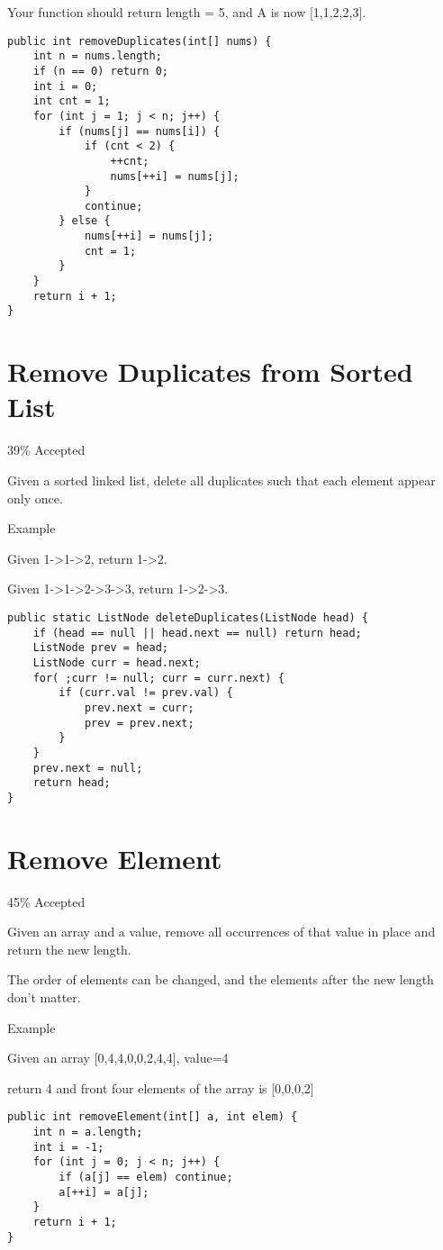 \documentclass[9pt, b5paaper]{book}
\begin{document}
Your function should return length = 5, and A is now [1,1,2,2,3].
\begin{verbatim}
public int removeDuplicates(int[] nums) {
    int n = nums.length;
    if (n == 0) return 0;
    int i = 0;
    int cnt = 1;
    for (int j = 1; j < n; j++) {
        if (nums[j] == nums[i]) {
            if (cnt < 2) {
                ++cnt;
                nums[++i] = nums[j];
            } 
            continue;   
        } else {
            nums[++i] = nums[j];
            cnt = 1;
        }
    }
    return i + 1;
}
\end{verbatim}
\section{Remove Duplicates from Sorted List}
\label{sec-1-56}

39\% Accepted

Given a sorted linked list, delete all duplicates such that each element appear only once.

Example

Given 1->1->2, return 1->2.

Given 1->1->2->3->3, return 1->2->3.
\begin{verbatim}
public static ListNode deleteDuplicates(ListNode head) {
    if (head == null || head.next == null) return head;
    ListNode prev = head;
    ListNode curr = head.next;
    for( ;curr != null; curr = curr.next) {
        if (curr.val != prev.val) {
            prev.next = curr;
            prev = prev.next;
        } 
    }
    prev.next = null;
    return head;
}
\end{verbatim}
\section{Remove Element}
\label{sec-1-57}

45\% Accepted

Given an array and a value, remove all occurrences of that value in place and return the new length.

The order of elements can be changed, and the elements after the new length don't matter.

Example

Given an array [0,4,4,0,0,2,4,4], value=4

return 4 and front four elements of the array is [0,0,0,2]
\begin{verbatim}
public int removeElement(int[] a, int elem) {            
    int n = a.length;
    int i = -1;
    for (int j = 0; j < n; j++) {
        if (a[j] == elem) continue;
        a[++i] = a[j];
    }
    return i + 1;
}
\end{verbatim}
\end{document}
